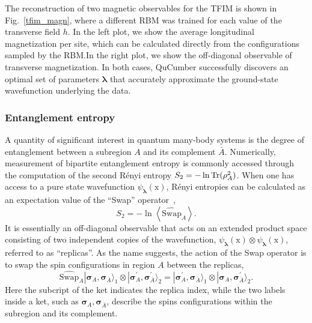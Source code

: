\documentclass[submission, Phys, hidelnks]{SciPost}
\newcommand{\x}{\bm{\mathrm{x}}}
\begin{document}
The reconstruction of two magnetic observables for the TFIM is shown in
Fig.~\ref{tfim_magn}, where a different RBM was trained for each value of
the transverse field $h$. In the left plot, we show the average longitudinal
magnetization per site, which can be calculated directly from the
configurations sampled by the RBM.\@ In the right plot, we show the off-diagonal
observable of transverse magnetization. In both cases, QuCumber successfully
discovers an optimal set of parameters $\bm{\lambda}$ that accurately
approximate the ground-state wavefunction underlying the data.


\subsubsection{Entanglement entropy}\label{sec:swap}

A quantity of significant interest in quantum many-body systems is the degree of
entanglement between a subregion $A$ and its complement $\bar{A}$.
Numerically, measurement of bipartite entanglement entropy is commonly accessed
through the computation of the second R\'enyi entropy $S_2 = - \ln {\rm Tr}(\rho_A^2)$.
When one has access to a pure state wavefunction $\psi_{\bm{\lambda}}(\x)$,
R\'enyi entropies can be calculated as an expectation value of the ``Swap'' operator~\cite{Swap},
\begin{equation}\label{Eq:renyi_entropy}
S_2 = - \ln \left\langle{   \widehat{\textrm{Swap}}_A  }\right\rangle.
\end{equation}
It is essentially an off-diagonal observable that acts on an extended product space consisting of
two independent copies of the wavefunction,
$\psi_{\bm{\lambda}}(\x) \otimes \psi_{\bm{\lambda}}(\x)$, referred to as
``replicas''.
As the name suggests, the action of the Swap operator is to swap the spin
configurations in region $A$ between the replicas,
\begin{equation}
  \widehat{\textrm{Swap}}_A |\bm{\sigma}_A, \bm{\sigma}_{\bar A}\rangle_1 \otimes  |\bm{\sigma}^{\prime}_A, \bm{\sigma}^{\prime}_{\bar A}\rangle_2 = |\bm{\sigma}^{\prime}_A, \bm\sigma_{\bar A}\rangle_1 \otimes  |\bm\sigma_A, \bm\sigma^{\prime}_{\bar A}\rangle_2 .
\end{equation}
Here the subcript of the ket indicates the replica index, while the two labels
inside a ket, such as ${\bm \sigma}_A, {\bm \sigma}_{\bar A}$, describe the spins
configurations within the subregion and its complement.
\end{document}
